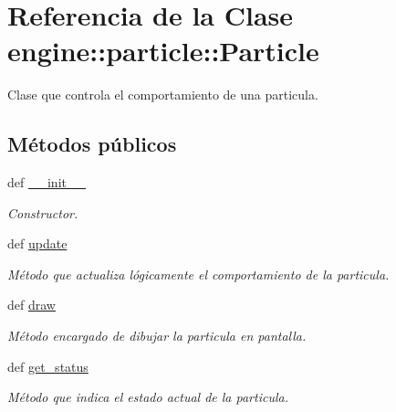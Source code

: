 \hypertarget{classengine_1_1particle_1_1Particle}{
\section{\-Referencia de la \-Clase engine\-:\-:particle\-:\-:\-Particle}
\label{classengine_1_1particle_1_1Particle}
}


\-Clase que controla el comportamiento de una particula.  


\subsection*{\-Métodos públicos}
\begin{DoxyCompactItemize}
\item 
def \hyperlink{classengine_1_1particle_1_1Particle_a12f0fdd509d4a93fbd43da2008874e79}{\-\_\-\-\_\-init\-\_\-\-\_\-}
\begin{DoxyCompactList}\small\item\em \-Constructor. \end{DoxyCompactList}\item 
\hypertarget{classengine_1_1particle_1_1Particle_ae473776b225c3412c37bdda69fe98b51}{
def \hyperlink{classengine_1_1particle_1_1Particle_ae473776b225c3412c37bdda69fe98b51}{update}}
\label{classengine_1_1particle_1_1Particle_ae473776b225c3412c37bdda69fe98b51}

\begin{DoxyCompactList}\small\item\em \-Método que actualiza lógicamente el comportamiento de la particula. \end{DoxyCompactList}\item 
def \hyperlink{classengine_1_1particle_1_1Particle_a22a494bd84fbfdde87ef83f0813b5d21}{draw}
\begin{DoxyCompactList}\small\item\em \-Método encargado de dibujar la particula en pantalla. \end{DoxyCompactList}\item 
def \hyperlink{classengine_1_1particle_1_1Particle_a32ddc69ff9ebf679325f79e78dfdc7cb}{get\-\_\-status}
\begin{DoxyCompactList}\small\item\em \-Método que indica el estado actual de la particula. \end{DoxyCompactList}\end{DoxyCompactItemize}
